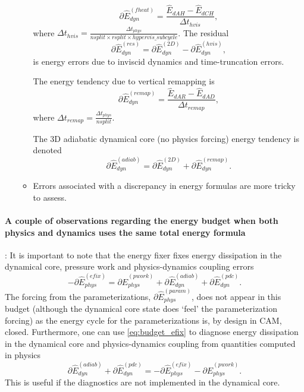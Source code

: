 \documentclass{agujournal}
\newcommand*{\gi}[1]{\widehat{#1}}
\begin{document}
\begin{enumerate}
\begin{itemize}
\begin{equation}
\partial \gi{E}_{dyn}^{({fheat})}=\frac{\gi{E}_{dAH}-\gi{E}_{dCH}}{\Delta t_{hvis}},
\end{equation}
where $\Delta t_{hvis}=\frac{\Delta t_{phys}}{nsplit\times rsplit \times hypervis\_subcycle}$. The residual
\begin{equation}
\partial \gi{E}_{dyn}^{({res})}=\partial \gi{E}_{dyn}^{({2D})}-\partial \gi{E}_{dyn}^{({hvis})},
\end{equation}
is energy errors due to inviscid dynamics and time-truncation errors.

The energy tendency due to vertical remapping is
\begin{equation}
\partial \gi{E}_{dyn}^{({remap})}=\frac{\gi{E}_{dAR}-\gi{E}_{dAD}}{\Delta t_{remap}},
\end{equation}
where $\Delta t_{remap}=\frac{\Delta t_{phys}}{nsplit}$.

The 3D adiabatic dynamical core (no physics forcing) energy tendency is denoted
\begin{equation}
\partial \gi{E}_{dyn}^{({adiab})}=\partial \gi{E}_{dyn}^{({2D})}+\partial \gi{E}_{dyn}^{({remap})}.
\end{equation}


{\color{red}{split parameters not defined}}
\item Errors associated with a discrepancy in energy formulas are more tricky to assess. {\color{red}{more text needed}}
\end{itemize}
\end{enumerate}
\paragraph{A couple of observations regarding the energy budget when both physics and dynamics uses the same total energy formula}: It is important to note that the energy fixer fixes energy dissipation in the dynamical core, pressure work and physics-dynamics coupling errors
\begin{equation}
\label{eq:budget_efix}
-\partial \gi{E}_{phys}^{({efix})}=\partial \gi{E}_{phys}^{({pwork})}+\partial \gi{E}_{dyn}^{({adiab})}+\partial \gi{E}_{dyn}^{({pdc})}.
\end{equation}
The forcing from the parameterizations, $\partial \gi{E}_{phys}^{({param})}$, does not appear in this budget (although the dynamical core state does `feel' the parameterization forcing) as the energy cycle for the parameterizations is, by design in CAM, closed. Furthermore, one can use \eqref{eq:budget_efix} to diagnose energy dissipation in the dynamical core and physics-dynamics coupling from quantities computed in physics
\begin{equation}
\partial \gi{E}_{dyn}^{({adiab})}+\partial \gi{E}_{dyn}^{({pdc})}=-\partial \gi{E}_{phys}^{({efix})}-\partial \gi{E}_{phys}^{({pwork})}.
\end{equation}
This is useful if the diagnostics are not implemented in the dynamical core.
\end{document}

